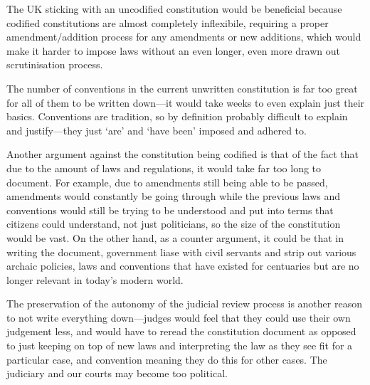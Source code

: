 \documentclass[11pt,a4paper]{article}
\begin{document}
	
The UK sticking with an uncodified constitution would be beneficial because codified constitutions are almost completely inflexibile, requiring a proper amendment\slash addition process for any amendments or new additions, which would make it harder to impose laws without an even longer, even more drawn out scrutinisation process.

The number of conventions in the current unwritten constitution is far too great for all of them to be written down---it would take weeks to even explain just their basics.  Conventions are tradition, so by definition probably difficult to explain and justify---they just `are' and `have been' imposed and adhered to.

Another argument against the constitution being codified is that of the fact that due to the amount of laws and regulations, it would take far too long to document.  For example, due to amendments still being able to be passed, amendments would constantly be going through while the previous laws and conventions would still be trying to be understood and put into terms that citizens could understand, not just politicians, so the size of the constitution would be vast.  On the other hand, as a counter argument, it could be that in writing the document, government liase with civil servants and strip out various archaic policies, laws and conventions that have existed for centuaries but are no longer relevant in today's modern world.

The preservation of the autonomy of the judicial review process is another reason to not write everything down---judges would feel that they could use their own judgement less, and would have to reread the constitution document as opposed to just keeping on top of new laws and interpreting the law as they see fit for a particular case, and convention meaning they do this for other cases.  The judiciary and our courts may become too political.
\end{document}
